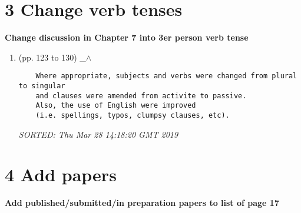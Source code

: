 \documentclass[12pt]{article}
\begin{document}
\section*{3 Change verb tenses}
\textbf{
	Change discussion in Chapter 7 into 3er person verb tense
	}

\begin{enumerate}

\item  (pp. 123 to 130)  \_$\wedge$  

	\begin{verbatim}
	Where appropriate, subjects and verbs were changed from plural to singular
	and clauses were amended from activite to passive.
	Also, the use of English were improved
	(i.e. spellings, typos, clumpsy clauses, etc). 
	\end{verbatim}
	\textit{
	SORTED: Thu Mar 28 14:18:20 GMT 2019
	}
	\\


%
%
%



\end{enumerate}


\section*{4 Add papers}
\textbf{
Add published/submitted/in preparation papers to list of page 17
}
\end{document}
